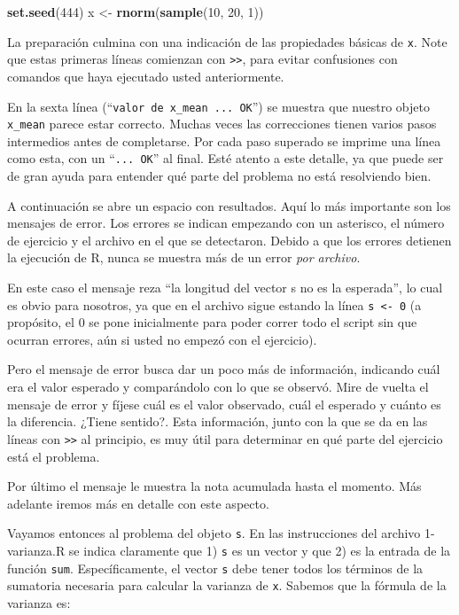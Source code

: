 \documentclass[]{article}
\newenvironment{Shaded}{}{}
\newcommand{\KeywordTok}[1]{\textcolor[rgb]{0.00,0.44,0.13}{\textbf{{#1}}}}
\newcommand{\DecValTok}[1]{\textcolor[rgb]{0.25,0.63,0.44}{{#1}}}
\newcommand{\NormalTok}[1]{{#1}}
\begin{document}
\begin{Shaded}
\begin{Highlighting}[]
\KeywordTok{set.seed}\NormalTok{(}\DecValTok{444}\NormalTok{)}
\NormalTok{x <- }\KeywordTok{rnorm}\NormalTok{(}\KeywordTok{sample}\NormalTok{(}\DecValTok{10}\NormalTok{, }\DecValTok{20}\NormalTok{, }\DecValTok{1}\NormalTok{))}
\end{Highlighting}
\end{Shaded}
La preparación culmina con una indicación de las propiedades básicas de
\texttt{x}. Note que estas primeras líneas comienzan con
\texttt{\textgreater{}\textgreater{}}, para evitar confusiones con
comandos que haya ejecutado usted anteriormente.

En la sexta línea (``\texttt{valor de x\_mean ... OK}'') se muestra que
nuestro objeto \texttt{x\_mean} parece estar correcto. Muchas veces las
correcciones tienen varios pasos intermedios antes de completarse. Por
cada paso superado se imprime una línea como esta, con un
``\texttt{... OK}'' al final. Esté atento a este detalle, ya que puede
ser de gran ayuda para entender qué parte del problema no está
resolviendo bien.

A continuación se abre un espacio con resultados. Aquí lo más importante
son los mensajes de error. Los errores se indican empezando con un
asterisco, el número de ejercicio y el archivo en el que se detectaron.
Debido a que los errores detienen la ejecución de R, nunca se muestra
más de un error \emph{por archivo}.

En este caso el mensaje reza ``la longitud del vector s no es la
esperada'', lo cual es obvio para nosotros, ya que en el archivo sigue
estando la línea \texttt{s \textless{}- 0} (a propósito, el 0 se pone
inicialmente para poder correr todo el script sin que ocurran errores,
aún si usted no empezó con el ejercicio).

Pero el mensaje de error busca dar un poco más de información, indicando
cuál era el valor esperado y comparándolo con lo que se observó. Mire de
vuelta el mensaje de error y fíjese cuál es el valor observado, cuál el
esperado y cuánto es la diferencia. ¿Tiene sentido?. Esta información,
junto con la que se da en las líneas con
\texttt{\textgreater{}\textgreater{}} al principio, es muy útil para
determinar en qué parte del ejercicio está el problema.

Por último el mensaje le muestra la nota acumulada hasta el momento. Más
adelante iremos más en detalle con este aspecto.

Vayamos entonces al problema del objeto \texttt{s}. En las instrucciones
del archivo 1-varianza.R se indica claramente que 1) \texttt{s} es un
vector y que 2) es la entrada de la función \texttt{sum}.
Específicamente, el vector \texttt{s} debe tener todos los términos de
la sumatoria necesaria para calcular la varianza de \texttt{x}. Sabemos
que la fórmula de la varianza es:
\end{document}
